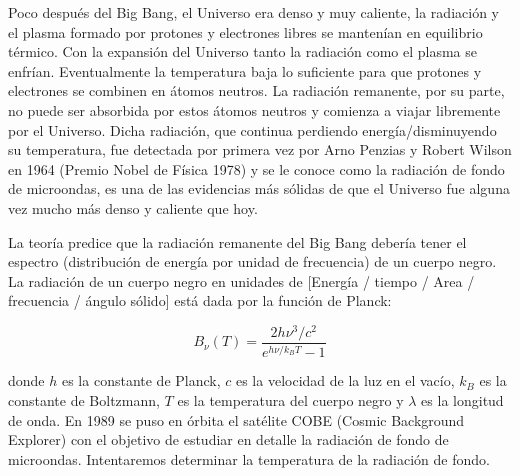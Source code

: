 \documentclass[letter, 11pt]{article}
\begin{document}
\vspace{1.5em}

Poco después del Big Bang, el Universo era denso y muy caliente, la radiación y
el plasma formado por protones y electrones libres se mantenían en equilibrio
térmico. Con la expansión del Universo tanto la radiación como el plasma se
enfrían. Eventualmente la temperatura baja lo suficiente para que protones y
electrones se combinen en átomos neutros. La radiación remanente, por su parte,
no puede ser absorbida por estos átomos neutros y comienza a viajar libremente
por el Universo. Dicha radiación, que continua perdiendo energía/disminuyendo
su temperatura, fue detectada por primera vez por Arno Penzias y Robert Wilson
en 1964 (Premio Nobel de Física 1978) y se le conoce como la radiación de fondo
de microondas, es una de las evidencias más sólidas de que el Universo fue
alguna vez mucho más denso y caliente que hoy.

La teoría predice que la radiación remanente del Big Bang debería tener el
espectro (distribución de energía por unidad de frecuencia) de un cuerpo negro.
La radiación de un cuerpo negro en unidades de [Energía / tiempo / Area /
frecuencia / ángulo sólido] está dada por la función de Planck:

$$B_\nu(T) = \frac{2 h \nu^3 / c^2}{e^{h\nu/k_BT} - 1} $$

donde $h$ es la constante de Planck, $c$ es la velocidad de la luz en el vacío,
$k_B$ es la constante de Boltzmann, $T$ es la temperatura del cuerpo negro y
$\lambda$ es la longitud de onda. En 1989 se puso en órbita el satélite COBE
(Cosmic Background Explorer) con el objetivo de estudiar en detalle la
radiación de fondo de microondas. Intentaremos determinar la temperatura de la
radiación de fondo.
\end{document}
